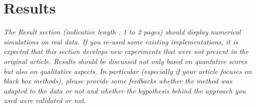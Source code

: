 \documentclass[11pt]{article}
\begin{document}
\section{Results}
\textit{
    The Result section (indicative length : 1 to 2 pages) should display numerical simulations on real data. If you re-used some existing implementations, it is expected that this section develops new experiments that were not present in the original article. Results should be discussed not only based on quantative scores but also on qualitative aspects. In particular (especially if your article focuses on black box methods), please provide some feedbacks whether the method was adapted to the data or not and whether the hypothesis behind the approach you used were validated or not.
}
\end{document}
